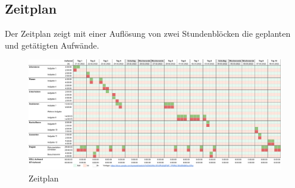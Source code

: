 \begin{landscape}
  \chapter{Zeitplan}
  Der Zeitplan zeigt mit einer Auflösung von zwei Stundenblöcken die geplanten und getätigten Aufwände.
  \begin{figure}[H]
    \begin{center}
      \includegraphics[width=1.55\textheight]{../res/timeplan.pdf}
    \end{center}
    \caption[\enquote{Zeitplan} erstellt mit Google Sheets]{Zeitplan}
    \label{fig:timeplan}
  \end{figure}
\end{landscape}
